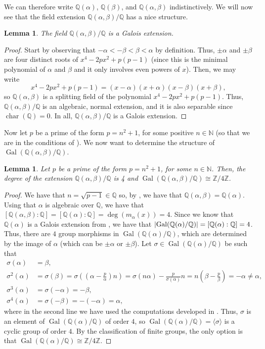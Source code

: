 \documentclass[a4paper,11pt]{article}
\theoremstyle{plain}
\newtheorem{lemma}[theorem]{Lemma}
\newcommand{\N}{\ensuremath{\mathbb{N}}} %
\newcommand{\Q}{\ensuremath{\mathbb{Q}}} %
\newcommand{\Z}{\ensuremath{\mathbb{Z}}} %
\DeclareMathOperator{\Gal}{Gal} %
\DeclareMathOperator{\Char}{char} %
\begin{document}
	We can therefore write $\Q(\alpha)$, $\Q(\beta)$, and $\Q(\alpha,\beta)$ indistinctively. We will now see that the field extension $\Q(\alpha,\beta)/\Q$ has a nice structure.
	\begin{lemma}\label{lemma:isGalois}
		The field $\Q(\alpha,\beta)/\Q$ is a Galois extension.
	\end{lemma}
	\begin{proof}
		Start by observing that $-\alpha<-\beta<\beta<\alpha$ by definition. Thus, $\pm\alpha$ and $\pm\beta$ are four distinct roots of $x^4-2px^2+p(p-1)$ (since this is the minimal polynomial of $\alpha$ and $\beta$ and it only involves even powers of $x$). Then, we may write
		\begin{equation}
			\label{eq:poli_split}
			x^4-2px^2+p(p-1)=(x-\alpha)(x+\alpha)(x-\beta)(x+\beta),
		\end{equation}
		so $\Q(\alpha,\beta)$ is a splitting field of the polynomial $x^4-2px^2+p(p-1)$. Thus, $\Q(\alpha,\beta)/\Q$ is an algebraic, normal extension, and it is also separable since $\Char(\Q)=0$. In all, $\Q(\alpha,\beta)/\Q$ is a Galois extension.
	\end{proof}
	
	Now let $p$ be a prime of the form $p=n^2+1$, for some positive $n\in\N$ (so that we are in the conditions of ). We now want to determine the structure of $\Gal(\Q(\alpha,\beta)/\Q)$.
	
	\begin{lemma}\label{lemma:Galstruct}
		Let $p$ be a prime of the form $p=n^2+1$, for some $n\in\N$. Then, the degree of the extension $\Q(\alpha,\beta)/\Q$ is 4 and $\Gal(\Q(\alpha,\beta)/\Q)\cong \Z/4\Z$.
	\end{lemma}
	\begin{proof}
		We have that $n=\sqrt{p-1}\in\Q$ so, by , we have that $\Q(\alpha,\beta)=\Q(\alpha)$. Using that $\alpha$ is algebraic over $\Q$, we have that $[\Q(\alpha,\beta):\Q]=[\Q(\alpha):\Q]=\deg(m_\alpha(x))=4$. Since we know that $\Q(\alpha)$ is a Galois extension from , we have that $\abs{\Gal(\Q(\alpha)/\Q)}=[\Q(\alpha):\Q]=4$. Thus, there are $4$ group morphisms in $\Gal(\Q(\alpha)/\Q)$, which are determined by the image of $\alpha$ (which can be $\pm\alpha$ or $\pm\beta$). Let $\sigma\in\Gal(\Q(\alpha)/\Q)$ be such that
		\begin{align*}
			\sigma(\alpha)&=\beta,\\
			\sigma^2(\alpha)&=\sigma(\beta)=\sigma\left(\left(\alpha-\frac{p}{\alpha}\right)n\right)=\sigma(n\alpha)-\frac{p}{\sigma(\alpha)}n=n\left(\beta-\frac{p}{\beta}\right)=-\alpha\neq \alpha,\\
			\sigma^3(\alpha)&=\sigma(-\alpha)=-\beta,\\
			\sigma^4(\alpha)&=\sigma(-\beta)=-(-\alpha)=\alpha,
		\end{align*}
		where in the second line we have used the computations developed in . Thus, $\sigma$ is an element of $\Gal(\Q(\alpha)/\Q)$ of order $4$, so $\Gal(\Q(\alpha)/\Q)=\langle\sigma\rangle$ is a cyclic group of order $4$. By the classification of finite groups, the only option is that $\Gal(\Q(\alpha)/\Q)\cong\Z/4\Z$.
	\end{proof}
	
\end{document}
